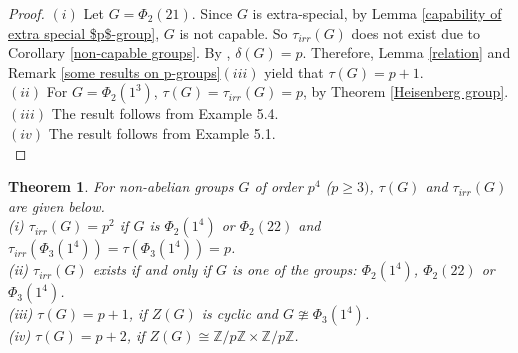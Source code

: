 \documentclass[a4paper,11pt]{amsart}
\numberwithin{equation}{section}
\numberwithin{equation}{subsection}
\newtheorem{theorem}{Theorem}[section]
\newcommand{\Z}{\mathbb{Z}}
\newcommand{\poonam}[1]{{\color{blue} #1}}
\begin{document}
\begin{proof} 
$(i)$ Let $G= \Phi_2(21)$. Since $G$ is extra-special, by Lemma \ref{capability of extra special $p$-group}, $G$ is not capable. So $\tau_{irr}(G)$ does not exist due to Corollary \ref{non-capable groups}.  
By \cite[Theorem 3.1(2)]{kaur}, $\delta(G)= p$. Therefore, Lemma \ref{relation} and Remark \ref{some results on p-groups}$(iii)$ yield that $\tau(G)= p+1$. \\
$(ii)$ For $G= \Phi_2(1^3)$, $\tau(G)= \tau_{irr}(G)= p$, by Theorem \ref{Heisenberg group}. \\ %
$(iii)$ The result follows from Example 5.4. \\
$(iv)$ The result follows from Example 5.1. \\
\end{proof}

\begin{theorem} \label{$p^4$}
For non-abelian groups $G$ of order $p^4$  ($p\geq 3)$, $\tau(G)$ and $\tau_{irr}(G)$ are given below. \\
(i) $\tau_{irr}(G)= p^2$ if $G$ is $\Phi_{2}(1^{4})$ or $\Phi_2(22)$ and $\tau_{irr}(\Phi_{3}(1^{4}))= \tau(\Phi_{3}(1^{4})) =p$. \\
(ii) $\tau_{irr}(G)$ exists if and only if $G$ is one of the groups: $\Phi_2(1^4)$, $\Phi_2(22)$ or $\Phi_3(1^4)$. \\
(iii) $\tau(G) = p+1$, if $Z(G)$ is cyclic and $G \ncong \Phi_3(1^4)$. \\
(iv) $\tau(G) = p+2$, if $Z(G) \cong \Z/p\Z \times \Z/p\Z$.

\end{theorem}
\end{document}
